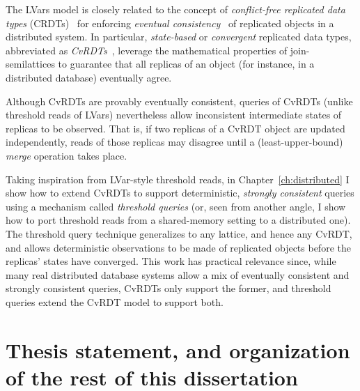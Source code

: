 The LVars model is closely related to the concept of
\emph{conflict-free replicated data types} (CRDTs)~\cite{crdts} for
enforcing \emph{eventual consistency}~\cite{vogels-ec} of replicated
objects in a distributed system.  In particular, \emph{state-based} or
\emph{convergent} replicated data types, abbreviated as
\emph{CvRDTs}~\cite{crdts, crdts-tr}, leverage the mathematical
properties of join-semilattices to guarantee that all replicas of an
object (for instance, in a distributed database) eventually agree.

Although CvRDTs are provably eventually consistent, queries of CvRDTs
(unlike threshold reads of LVars) nevertheless allow inconsistent
intermediate states of replicas to be observed.  That is, if two
replicas of a CvRDT object are updated independently, reads of those
replicas may disagree until a (least-upper-bound) \emph{merge}
operation takes place.

Taking inspiration from LVar-style threshold reads, in
Chapter~\ref{ch:distributed} I show how to extend CvRDTs to support
deterministic, \emph{strongly consistent} queries using a mechanism
called \emph{threshold queries} (or, seen from another angle, I show
how to port threshold reads from a shared-memory setting to a
distributed one).  The threshold query technique generalizes to any
lattice, and hence any CvRDT, and allows deterministic observations to
be made of replicated objects before the replicas' states have
converged.  This work has practical relevance since, while many real
distributed database systems allow a mix of eventually consistent and
strongly consistent queries, CvRDTs only support the former, and
threshold queries extend the CvRDT model to support both.

\section{Thesis statement, and organization of the rest of this dissertation}\label{s:thesis}

